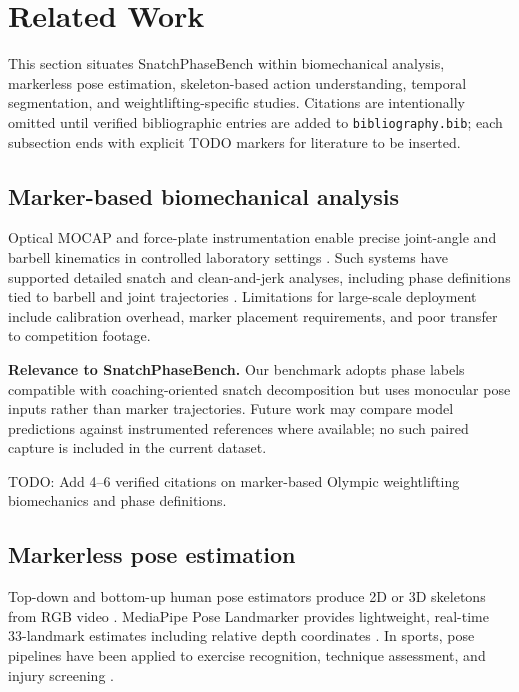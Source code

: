 \section{Related Work}
\label{sec:related}

This section situates SnatchPhaseBench within biomechanical analysis, markerless pose estimation, skeleton-based action understanding, temporal segmentation, and weightlifting-specific studies.
Citations are intentionally omitted until verified bibliographic entries are added to \texttt{bibliography.bib}; each subsection ends with explicit \textsc{TODO} markers for literature to be inserted.

\subsection{Marker-based biomechanical analysis}
\label{sec:related:mocap}

Optical \acs{MOCAP} and force-plate instrumentation enable precise joint-angle and barbell kinematics in controlled laboratory settings .
Such systems have supported detailed snatch and clean-and-jerk analyses, including phase definitions tied to barbell and joint trajectories .
Limitations for large-scale deployment include calibration overhead, marker placement requirements, and poor transfer to competition footage.

\textbf{Relevance to SnatchPhaseBench.}
Our benchmark adopts phase labels compatible with coaching-oriented snatch decomposition but uses monocular pose inputs rather than marker trajectories.
Future work may compare model predictions against instrumented references where available; no such paired capture is included in the current dataset.

\textsc{TODO:} Add 4--6 verified citations on marker-based Olympic weightlifting biomechanics and phase definitions.

\subsection{Markerless pose estimation}
\label{sec:related:pose}

Top-down and bottom-up human pose estimators produce 2D or 3D skeletons from RGB video .
MediaPipe Pose Landmarker provides lightweight, real-time 33-landmark estimates including relative depth coordinates .
In sports, pose pipelines have been applied to exercise recognition, technique assessment, and injury screening .


